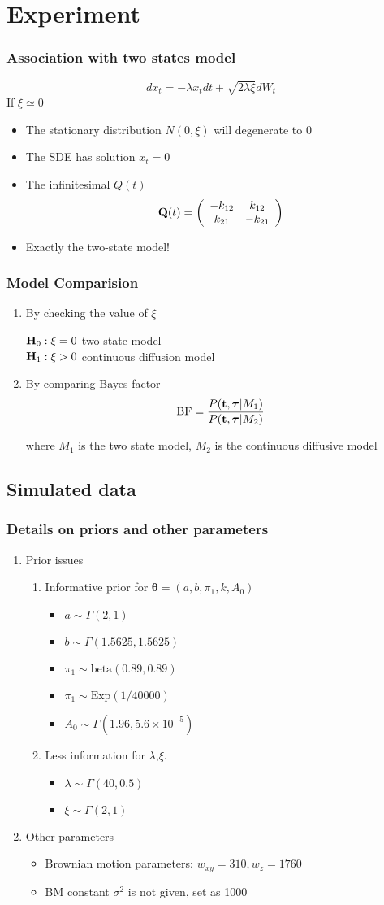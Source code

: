 \documentclass[11pt]{beamer}
\newcommand{\bit}{\begin{itemize}\setlength{\itemsep}{0cm}\setlength{\topsep}{0cm}}
\newcommand{\eit}{\end{itemize}}
\newcommand{\benum}{\begin{enumerate}\setlength{\itemsep}{0cm}\setlength{\parsep
}{0cm}}
\newcommand{\eenum}{\end{enumerate}}
\newcommand{\bQ}{{\bf Q}}
\newcommand{\bH}{{\bf H}}
\newcommand{\btheta}{{\boldsymbol{\theta}}}
\newcommand{\btau}{{\boldsymbol{\tau}}}
\newcommand{\bt}{{\bf t}}
\begin{document}
\section{Experiment}
\begin{frame}
	\frametitle{Association with two states model}
	$$dx_t=-\lambda x_tdt+\sqrt{2\lambda\xi}dW_t$$
	If $\xi \simeq 0$
	\bit
	\item The stationary distribution $N(0,\xi)$ will degenerate to 0
	\item The SDE has solution $x_t=0$
\pause
	\item The infinitesimal $Q(t)$
	\[
	\bQ(t)=\left(\begin{array}{cc}
	-k_{12} & k_{12}\\
	k_{21}& -k_{21}
	\end{array}\right)
	\]
	\pause
	\item Exactly the two-state model! 
	\eit
\end{frame}
\begin{frame}
	\frametitle{Model Comparision}
	\benum
	\pause
	\item By checking the value of $\xi$
	
	$\bH_0: \xi=0$ two-state model\\
	$\bH_1:\xi>0$ continuous diffusion model 
	\pause
	\item By comparing Bayes factor 	$$\mbox{BF}=\dfrac{P(\bt,\btau|M_1)}{P(\bt,\btau|M_2)}$$
	
	where $M_1$ is the two state model, $M_2$ is the continuous diffusive model
	\eenum
\end{frame}
\subsection{Simulated data}
\begin{frame}
\frametitle{Details on priors and other parameters}
\benum
\item Prior issues
\benum
\item Informative prior for $\btheta=(a,b,\pi_1,k,A_0)$
\bit
\item $a\sim \Gamma(2,1)$
\item $b\sim \Gamma(1.5625,1.5625)$
\item $\pi_1\sim \mbox{beta}(0.89,0.89)$
\item $\pi_1\sim \mbox{Exp}(1/40000)$
\item $A_0\sim \Gamma(1.96,5.6\times10^{-5})$
\eit
\item Less information for $\lambda$,$\xi$. 
\bit
\item $\lambda\sim \Gamma(40,0.5)$
\item $\xi\sim \Gamma(2,1)$
\eit
\eenum
\item Other parameters
\bit
\item Brownian motion parameters: $w_{xy}=310,w_z=1760$
\item BM constant $\sigma^2$ is not given, set as 1000
\eit
\eenum
\end{frame}
\end{document}
